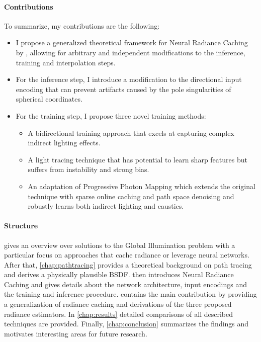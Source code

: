 \paragraph{Contributions} To summarize, my contributions are the following:
\begin{itemize}
    \item I propose a generalized theoretical framework for Neural Radiance Caching by \textcite{muller2021}, allowing for arbitrary and independent modifications to the inference, training and interpolation steps.
    \item For the inference step, I introduce a modification to the directional input encoding that can prevent artifacts caused by the pole singularities of spherical coordinates.
    \item For the training step, I propose three novel training methods:
    \begin{itemize}
        \item A bidirectional training approach that excels at capturing complex indirect lighting effects.
        \item A light tracing technique that has potential to learn sharp features but suffers from instability and strong bias.
        \item An adaptation of Progressive Photon Mapping \parencite{jensen1996,hachisuka2008} which extends the original technique with sparse online caching and path space denoising and robustly learns both indirect lighting and caustics.
    \end{itemize}
\end{itemize}

\paragraph{Structure}  gives an overview over solutions to the Global Illumination problem with a particular focus on approaches that cache radiance or leverage neural networks.
After that, \cref{chap:pathtracing} provides a theoretical background on path tracing and derives a physically plausible BSDF.
 then introduces Neural Radiance Caching and gives details about the network architecture, input encodings and the training and inference procedure.
 contains the main contribution by providing a generalization of radiance caching and derivations of the three proposed radiance estimators.
In \cref{chap:results} detailed comparisons of all described techniques are provided.
Finally, \cref{chap:conclusion} summarizes the findings and motivates interesting areas for future research.
